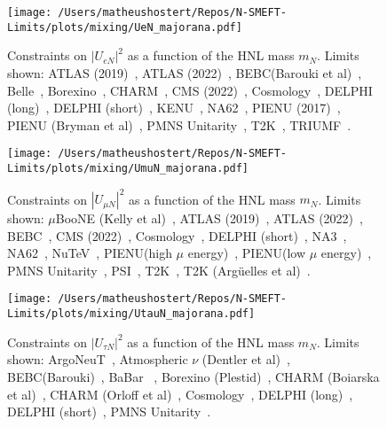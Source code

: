 \documentclass{revtex4-1}%
\begin{document}
%
\normalsize%


\begin{figure}[h!]%
\centering%
\texttt{[image: /Users/matheushostert/Repos/N-SMEFT-Limits/plots/mixing/UeN\_majorana.pdf]}%
\caption{Constraints on $|U_{e N}|^2$ as a function of the HNL mass $m_N$. Limits shown: ATLAS (2019)~\cite{ATLAS:2019kpx}, ATLAS (2022)~\cite{ATLAS:2022atq}, BEBC(Barouki et al)~\cite{Barouki:2022bkt}, Belle~\cite{Belle:2013ytx}, Borexino~\cite{Borexino:2013bot}, CHARM~\cite{CHARM:1985nku}, CMS (2022)~\cite{CMS:2022fut}, Cosmology~\cite{Sabti:2020yrt}, DELPHI (long)~\cite{DELPHI:1996qcc}, DELPHI (short)~\cite{DELPHI:1996qcc}, KENU~\cite{Bryman:2019bjg}, NA62~\cite{NA62:2020mcv}, PIENU (2017)~\cite{PIENU:2017wbj}, PIENU (Bryman et al)~\cite{Bryman:2019bjg}, PMNS Unitarity~\cite{Workinprogress}, T2K~\cite{T2K:2019jwa}, TRIUMF~\cite{Britton:1992xv}.}%
\end{figure}

%


\begin{figure}[h!]%
\centering%
\texttt{[image: /Users/matheushostert/Repos/N-SMEFT-Limits/plots/mixing/UmuN\_majorana.pdf]}%
\caption{Constraints on $|U_{\mu N}|^2$ as a function of the HNL mass $m_N$. Limits shown: $\mu$BooNE (Kelly et al)~\cite{Kelly:2021xbv}, ATLAS (2019)~\cite{ATLAS:2019kpx}, ATLAS (2022)~\cite{ATLAS:2022atq}, BEBC~\cite{WA66:1985mfx}, CMS (2022)~\cite{CMS:2022fut}, Cosmology~\cite{Sabti:2020yrt}, DELPHI (short)~\cite{DELPHI:1996qcc}, NA3~\cite{NA3:1986ahv}, NA62~\cite{NA62:2021bji}, NuTeV~\cite{NuTeV:1999kej}, PIENU(high $\mu$ energy)~\cite{PIENU:2019usb}, PIENU(low $\mu$ energy)~\cite{PIENU:2019usb}, PMNS Unitarity~\cite{Workinprogress}, PSI~\cite{Daum:1987bg}, T2K~\cite{T2K:2019jwa}, T2K (Arg\"uelles et al)~\cite{Arguelles:2021dqn}.}%
\end{figure}

%


\begin{figure}[h!]%
\centering%
\texttt{[image: /Users/matheushostert/Repos/N-SMEFT-Limits/plots/mixing/UtauN\_majorana.pdf]}%
\caption{Constraints on $|U_{\tau N}|^2$ as a function of the HNL mass $m_N$. Limits shown: ArgoNeuT~\cite{ArgoNeuT:2021clc}, Atmospheric $\nu$ (Dentler et al)~\cite{Dentler:2018sju}, BEBC(Barouki)~\cite{Barouki:2022bkt}, BaBar ~\cite{BaBar:2022cqj}, Borexino (Plestid)~\cite{Plestid:2020ssy}, CHARM (Boiarska et al)~\cite{Boiarska:2021yho}, CHARM (Orloff et al)~\cite{Orloff:2002de}, Cosmology~\cite{Sabti:2020yrt}, DELPHI (long)~\cite{DELPHI:1996qcc}, DELPHI (short)~\cite{DELPHI:1996qcc}, PMNS Unitarity~\cite{Workinprogress}.}%
\end{figure}

%
%
%
\end{document}
